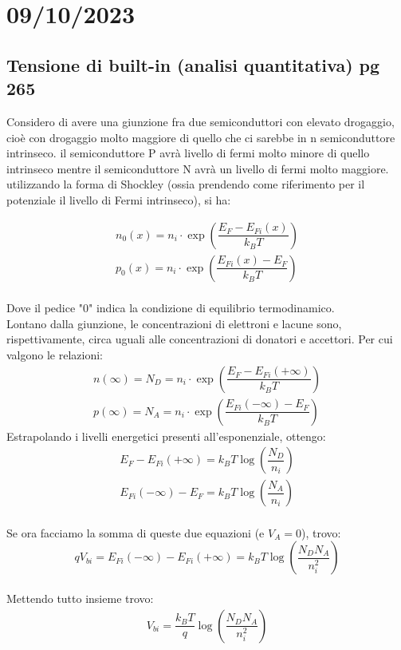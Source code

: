 \section*{09/10/2023}

\subsection{Tensione di built-in (analisi quantitativa) pg 265}
Considero di avere una giunzione fra due semiconduttori con elevato drogaggio, cioè con drogaggio molto maggiore di quello che ci sarebbe in n semiconduttore intrinseco. il semiconduttore P avrà livello di fermi molto minore di quello intrinseco mentre il semiconduttore N avrà un livello di fermi molto maggiore.
utilizzando la forma di Shockley (ossia prendendo come riferimento per il potenziale il livello di Fermi intrinseco), si ha:

\begin{align*}
    n_0(x)=n_i \cdot \exp\left (\dfrac{E_F-E_{Fi}(x)}{k_B T} \right)\\
    p_0(x)=n_i \cdot \exp\left (\dfrac{E_{Fi}(x)-E_F}{k_B T} \right)
 \end{align*}\\
 Dove il pedice "0" indica la condizione di equilibrio termodinamico.\\
 Lontano dalla giunzione, le concentrazioni di elettroni e lacune sono, rispettivamente, circa uguali alle concentrazioni di donatori e accettori. Per cui valgono le relazioni:
\begin{align}
    n(\infty)=N_D=n_i \cdot \exp\left (\dfrac{E_F-E_{Fi}(+\infty)}{k_B T} \right)\\
    p(\infty)=N_A=n_i \cdot \exp\left (\dfrac{E_{Fi}(-\infty)-E_F}{k_B T} \right)
 \end{align}
Estrapolando i livelli energetici presenti all'esponenziale, ottengo:
 \begin{align}
     E_F-E_{Fi}(+\infty) = k_B T \log \left({\dfrac{N_D}{n_i}} \right)\\
     E_{Fi}(-\infty)-E_F = k_B T \log \left({\dfrac{N_A}{n_i}} \right)
 \end{align}\\
Se ora facciamo la somma di queste due equazioni (e $V_A=0$), trovo:
 \begin{equation}
     qV_{bi}=E_{Fi}(-\infty)-E_{Fi}(+\infty)=k_B T \log \left( \dfrac{N_D N_A}{n_i^2}\right)
 \end{equation}\\
Mettendo tutto insieme trovo:
 \begin{align}
 \label{eqn:Vbi}
      V_{bi}= \dfrac{k_B T}{q}\log \left( \dfrac{N_D N_A}{n_i^2}\right)
 \end{align}

